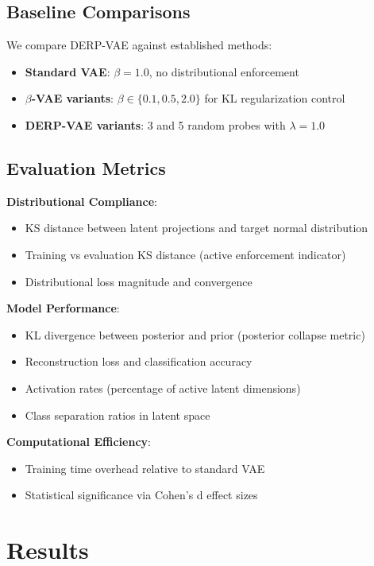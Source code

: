 \documentclass[11pt]{article}
\begin{document}
\subsection{Baseline Comparisons}

We compare DERP-VAE against established methods:

\begin{itemize}
\item \textbf{Standard VAE}: $\beta = 1.0$, no distributional enforcement
\item \textbf{$\beta$-VAE variants}: $\beta \in \{0.1, 0.5, 2.0\}$ for KL regularization control
\item \textbf{DERP-VAE variants}: 3 and 5 random probes with $\lambda = 1.0$
\end{itemize}

\subsection{Evaluation Metrics}

\textbf{Distributional Compliance}:
\begin{itemize}
\item KS distance between latent projections and target normal distribution
\item Training vs evaluation KS distance (active enforcement indicator)
\item Distributional loss magnitude and convergence
\end{itemize}

\textbf{Model Performance}:
\begin{itemize}
\item KL divergence between posterior and prior (posterior collapse metric)
\item Reconstruction loss and classification accuracy
\item Activation rates (percentage of active latent dimensions)
\item Class separation ratios in latent space
\end{itemize}

\textbf{Computational Efficiency}:
\begin{itemize}
\item Training time overhead relative to standard VAE
\item Statistical significance via Cohen's d effect sizes
\end{itemize}

\section{Results}
\end{document}
